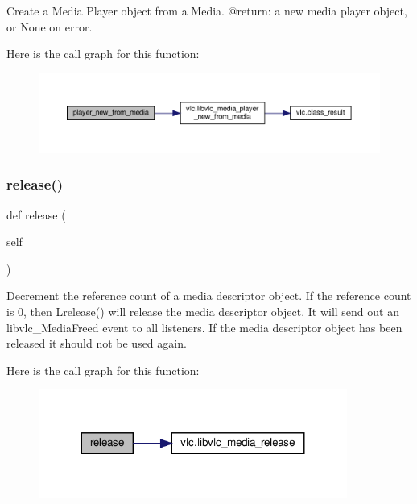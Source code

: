 \begin{DoxyVerb}Create a Media Player object from a Media.
@return: a new media player object, or None on error.
\end{DoxyVerb}
 Here is the call graph for this function\+:
\nopagebreak
\begin{figure}[H]
\begin{center}
\leavevmode
\includegraphics[width=350pt]{classvlc_1_1_media_a6cf2d750b6364dc903552fd0b097cca9_cgraph}
\end{center}
\end{figure}
\mbox{\label{classvlc_1_1_media_a4cd51e19135e5ad4a19eae3ea9c60537}} 
\subsubsection{\texorpdfstring{release()}{release()}}
{\footnotesize\ttfamily def release (\begin{DoxyParamCaption}\item[{}]{self }\end{DoxyParamCaption})}

\begin{DoxyVerb}Decrement the reference count of a media descriptor object. If the
reference count is 0, then L{release}() will release the
media descriptor object. It will send out an libvlc_MediaFreed event
to all listeners. If the media descriptor object has been released it
should not be used again.
\end{DoxyVerb}
 Here is the call graph for this function\+:
\nopagebreak
\begin{figure}[H]
\begin{center}
\leavevmode
\includegraphics[width=287pt]{classvlc_1_1_media_a4cd51e19135e5ad4a19eae3ea9c60537_cgraph}
\end{center}
\end{figure}
\mbox{\label{classvlc_1_1_media_a6394d82a0b79f0f91bb059d20ab43490}} 

